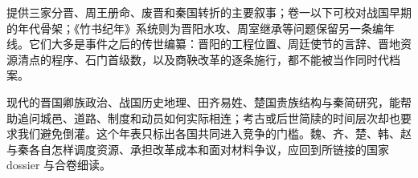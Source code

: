 \begin{sourcenote}[年表的材料边界]
提供三家分晋、周王册命、废晋和秦国转折的主要叙事；卷一以下可校对战国早期的年代骨架；《竹书纪年》系统则为晋阳水攻、周室继承等问题保留另一条编年线。它们大多是事件之后的传世编纂：晋阳的工程位置、周廷使节的言辞、晋地资源清点的程序、石门首级数，以及商鞅改革的逐条施行，都不能被当作同时代档案。

现代的晋国卿族政治、战国历史地理、田齐易姓、楚国贵族结构与秦简研究，能帮助追问城邑、道路、制度和动员如何实际相连；考古或后世简牍的时间层次却也要求我们避免倒灌。这个年表只标出各国共同进入竞争的门槛。魏、齐、楚、韩、赵与秦各自怎样调度资源、承担改革成本和面对材料争议，应回到所链接的国家 dossier 与合卷细读。
\end{sourcenote}
